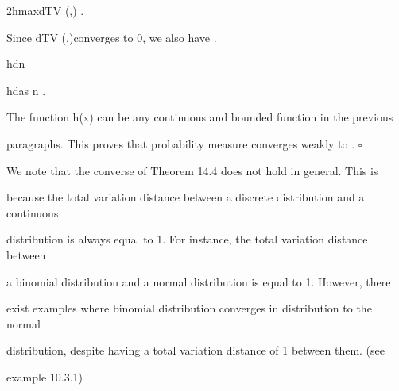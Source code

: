 \vert\vert\vert \leq 2hmaxdTV (\mun,\mu ) .

Since dTV (\mun,\mu )converges to 0, we also have .

\int

hd\mu n \to

\int

hd\mu as n \to\infty .

The function h(x) can be any continuous and bounded function in the previous

paragraphs. This proves that probability measure \mun converges weakly to \mu. \hfill $\square$

We note that the converse of Theorem 14.4 does not hold in general. This is

because the total variation distance between a discrete distribution and a continuous

distribution is always equal to 1. For instance, the total variation distance between

a binomial distribution and a normal distribution is equal to 1. However, there

exist examples where binomial distribution converges in distribution to the normal

distribution, despite having a total variation distance of 1 between them. (see

example 10.3.1)
